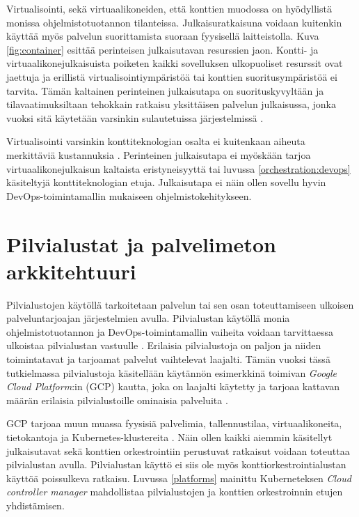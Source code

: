 Virtualisointi, sekä virtuaalikoneiden, että konttien muodossa on hyödyllistä monissa ohjelmistotuotannon tilanteissa.
Julkaisuratkaisuna voidaan kuitenkin käyttää myös palvelun suorittamista suoraan fyysisellä laitteistolla.
Kuva \ref{fig:container} esittää perinteisen julkaisutavan resurssien jaon.
Kontti- ja virtuaalikonejulkaisuista poiketen kaikki sovelluksen ulkopuoliset resurssit ovat jaettuja ja erillistä virtualisointiympäristöä tai konttien suoritusympäristöä ei tarvita. 
Tämän kaltainen perinteinen julkaisutapa on suorituskyvyltään ja tilavaatimuksiltaan tehokkain ratkaisu yksittäisen palvelun julkaisussa, jonka vuoksi sitä käytetään varsinkin sulautetuissa järjestelmissä \cite{Heiser08}.

Virtualisointi varsinkin konttiteknologian osalta ei kuitenkaan aiheuta merkittäviä kustannuksia \cite{torrez19}.
Perinteinen julkaisutapa ei myöskään tarjoa virtuaalikonejulkaisun kaltaista eristyneisyyttä tai luvussa \ref{orchestration:devops} käsiteltyjä konttiteknologian etuja.
Julkaisutapa ei näin ollen sovellu hyvin DevOps-toimintamallin mukaiseen ohjelmistokehitykseen.

\section{Pilvialustat ja palvelimeton arkkitehtuuri}

Pilvialustojen käytöllä tarkoitetaan palvelun tai sen osan toteuttamiseen ulkoisen palveluntarjoajan järjestelmien avulla.
Pilvialustan käytöllä monia ohjelmistotuotannon ja DevOps-toimintamallin vaiheita voidaan tarvittaessa ulkoistaa pilvialustan vastuulle \cite{tomarchio20}.
Erilaisia pilvialustoja on paljon ja niiden toimintatavat ja tarjoamat palvelut vaihtelevat laajalti.
Tämän vuoksi tässä tutkielmassa pilvialustoja käsitellään käytännön esimerkkinä toimivan \textit{Google Cloud Platform}:in (GCP) kautta, joka on laajalti käytetty ja tarjoaa kattavan määrän erilaisia pilvialustoille ominaisia palveluita \cite{ahuja20}.

GCP tarjoaa muun muassa fyysisiä palvelimia, tallennustilaa, virtuaalikoneita, tietokantoja ja Kubernetes-klustereita \cite{Products23}.
Näin ollen kaikki aiemmin käsitellyt julkaisutavat sekä konttien orkestrointiin perustuvat ratkaisut voidaan toteuttaa pilvialustan avulla.
Pilvialustan käyttö ei siis ole myös konttiorkestrointialustan käyttöä poissulkeva ratkaisu.
Luvussa \ref{platforms} mainittu Kuberneteksen \textit{Cloud controller manager} mahdollistaa pilvialustojen ja konttien orkestroinnin etujen yhdistämisen.

